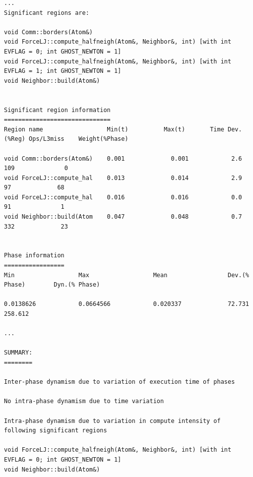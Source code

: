 \begin{lstlisting}[caption={Summary of Application Pre-analysis},label=lst:minimd_dynamism_summary]
...
Significant regions are:

void Comm::borders(Atom&)
void ForceLJ::compute_halfneigh(Atom&, Neighbor&, int) [with int EVFLAG = 0; int GHOST_NEWTON = 1]
void ForceLJ::compute_halfneigh(Atom&, Neighbor&, int) [with int EVFLAG = 1; int GHOST_NEWTON = 1]
void Neighbor::build(Atom&)


Significant region information
==============================
Region name                  Min(t)          Max(t)       Time Dev.(%Reg) Ops/L3miss    Weight(%Phase)

void Comm::borders(Atom&)    0.001             0.001            2.6           109              0
void ForceLJ::compute_hal    0.013             0.014            2.9            97             68
void ForceLJ::compute_hal    0.016             0.016            0.0            91              1
void Neighbor::build(Atom    0.047             0.048            0.7           332             23


Phase information
=================
Min                  Max                  Mean                 Dev.(% Phase)        Dyn.(% Phase)

0.0138626            0.0664566            0.020337             72.731               258.612

...

SUMMARY:
========

Inter-phase dynamism due to variation of execution time of phases

No intra-phase dynamism due to time variation

Intra-phase dynamism due to variation in compute intensity of following significant regions

void ForceLJ::compute_halfneigh(Atom&, Neighbor&, int) [with int EVFLAG = 0; int GHOST_NEWTON = 1]
void Neighbor::build(Atom&)
\end{lstlisting}

